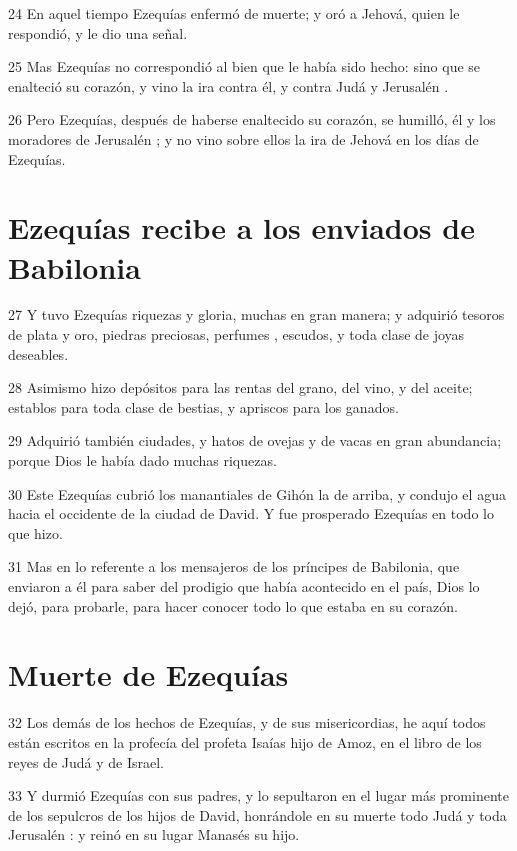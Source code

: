 \par 24 En aquel tiempo Ezequías enfermó de muerte; y oró a Jehová, quien le respondió, y le dio una señal.
\par 25 Mas Ezequías no correspondió al bien que le había sido hecho: sino que se enalteció su corazón, y vino la ira contra él, y contra Judá y Jerusalén .
\par 26 Pero Ezequías, después de haberse enaltecido su corazón, se humilló, él y los moradores de Jerusalén ; y no vino sobre ellos la ira de Jehová en los días de Ezequías.

\section*{Ezequías recibe a los enviados de Babilonia }

\par 27 Y tuvo Ezequías riquezas y gloria, muchas en gran manera; y adquirió tesoros de plata y oro, piedras preciosas, perfumes , escudos, y toda clase de joyas deseables.
\par 28 Asimismo hizo depósitos para las rentas del grano, del vino, y del aceite; establos para toda clase de bestias, y apriscos para los ganados. 
\par 29 Adquirió también ciudades, y hatos de ovejas y de vacas en gran abundancia; porque Dios le había dado muchas riquezas.
\par 30 Este Ezequías cubrió los manantiales de Gihón la de arriba, y condujo el agua hacia el occidente de la ciudad de David. Y fue prosperado Ezequías en todo lo que hizo.
\par 31 Mas en lo referente a los mensajeros de los príncipes de Babilonia, que enviaron a él para saber del prodigio que había acontecido en el país, Dios lo dejó, para probarle, para hacer conocer todo lo que estaba en su corazón.

\section*{Muerte de Ezequías }

\par 32 Los demás de los hechos de Ezequías, y de sus misericordias, he aquí todos están escritos en la profecía del profeta Isaías hijo de Amoz, en el libro de los reyes de Judá y de Israel.
\par 33 Y durmió Ezequías con sus padres, y lo sepultaron en el lugar más prominente de los sepulcros de los hijos de David, honrándole en su muerte todo Judá y toda Jerusalén : y reinó en su lugar Manasés su hijo.

